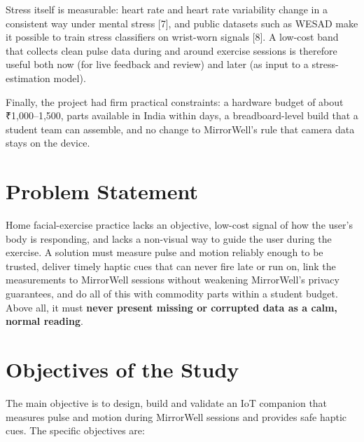 \documentclass[12pt,letterpaper,oneside]{report}
\begin{document}
Stress itself is measurable: heart rate and heart rate variability change in a consistent way under mental stress [7], and public datasets such as WESAD make it possible to train stress classifiers on wrist-worn signals [8]. A low-cost band that collects clean pulse data during and around exercise sessions is therefore useful both now (for live feedback and review) and later (as input to a stress-estimation model).


Finally, the project had firm practical constraints: a hardware budget of about ₹1,000–1,500, parts available in India within days, a breadboard-level build that a student team can assemble, and no change to MirrorWell's rule that camera data stays on the device.


\section{Problem Statement}\label{sec:1.3}

Home facial-exercise practice lacks an objective, low-cost signal of how the user's body is responding, and lacks a non-visual way to guide the user during the exercise. A solution must measure pulse and motion reliably enough to be trusted, deliver timely haptic cues that can never fire late or run on, link the measurements to MirrorWell sessions without weakening MirrorWell's privacy guarantees, and do all of this with commodity parts within a student budget. Above all, it must \textbf{never present missing or corrupted data as a calm, normal reading}.


\section{Objectives of the Study}\label{sec:1.4}

The main objective is to design, build and validate an IoT companion that measures pulse and motion during MirrorWell sessions and provides safe haptic cues. The specific objectives are:
\end{document}
